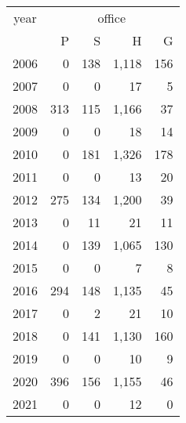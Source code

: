 \footnotesize\begin{tabular}[t]{lrrrr}
\toprule
\multicolumn{1}{c}{year} & \multicolumn{4}{c}{office} \\
\cmidrule(l{3pt}r{3pt}){1-1} \cmidrule(l{3pt}r{3pt}){2-5}
  & P & S & H & G\\
\midrule
2006 & 0 & 138 & 1,118 & 156\\
2007 & 0 & 0 & 17 & 5\\
2008 & 313 & 115 & 1,166 & 37\\
2009 & 0 & 0 & 18 & 14\\
2010 & 0 & 181 & 1,326 & 178\\
2011 & 0 & 0 & 13 & 20\\
2012 & 275 & 134 & 1,200 & 39\\
2013 & 0 & 11 & 21 & 11\\
2014 & 0 & 139 & 1,065 & 130\\
2015 & 0 & 0 & 7 & 8\\
2016 & 294 & 148 & 1,135 & 45\\
2017 & 0 & 2 & 21 & 10\\
2018 & 0 & 141 & 1,130 & 160\\
2019 & 0 & 0 & 10 & 9\\
2020 & 396 & 156 & 1,155 & 46\\
2021 & 0 & 0 & 12 & 0\\
\bottomrule
\end{tabular}
